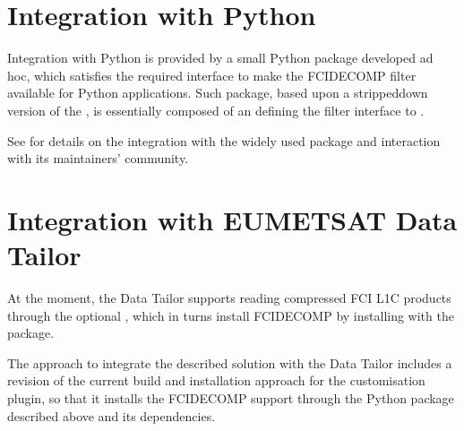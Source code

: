 \documentclass[a4paper,10pt,english]{sphinxmanual}
\begin{document}
\section{Integration with Python}
\label{\detokenize{support_to_usage_patterns:integration-with-python}}
\sphinxAtStartPar
Integration with Python is provided by a small Python package developed ad hoc, which satisfies the required 
interface to make the FCIDECOMP filter available for Python applications. Such package, based upon a stripped\sphinxhyphen{}down
version of the {\hyperref[\detokenize{introduction:hdf5plugin}]{}}, is essentially composed of an  defining the
filter interface to .

\sphinxAtStartPar
See {\hyperref[\detokenize{a_integration_with_hdf5plugin:integration-with-hdf5plugin}]{}} for details on the integration with the widely used  package and
interaction with its maintainers’ community.


\section{Integration with EUMETSAT Data Tailor}
\label{\detokenize{support_to_usage_patterns:integration-with-eumetsat-data-tailor}}\label{\detokenize{support_to_usage_patterns:integration-with-data-tailor}}
\sphinxAtStartPar
At the moment, the Data Tailor supports reading compressed FCI L1C products through the optional
 {\hyperref[\detokenize{introduction:mtg4africa}]{}}, which in turns install FCIDECOMP by installing
with  the  package.

\sphinxAtStartPar
The approach to integrate the described solution with the Data Tailor includes a revision of the current
build and installation approach for the  customisation plugin, so that it
installs the FCIDECOMP support through the Python package described above and its dependencies.
\end{document}
